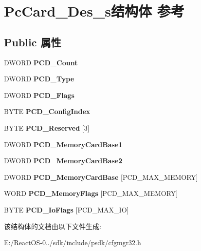 \hypertarget{struct_pc_card___des__s}{}\section{Pc\+Card\+\_\+\+Des\+\_\+s结构体 参考}
\label{struct_pc_card___des__s}
\subsection*{Public 属性}
\begin{DoxyCompactItemize}
\item 
\mbox{\label{struct_pc_card___des__s_ad6e3ef17a3f716eb30a77d6a23bf21c7}} 
D\+W\+O\+RD {\bfseries P\+C\+D\+\_\+\+Count}
\item 
\mbox{\label{struct_pc_card___des__s_ab2a809210da5d6c67a18ac30190928b5}} 
D\+W\+O\+RD {\bfseries P\+C\+D\+\_\+\+Type}
\item 
\mbox{\label{struct_pc_card___des__s_a30b77d8ec7f62c51acf4dbcc5dca4b2f}} 
D\+W\+O\+RD {\bfseries P\+C\+D\+\_\+\+Flags}
\item 
\mbox{\label{struct_pc_card___des__s_a4e29cedce929dd11760eafa000857254}} 
B\+Y\+TE {\bfseries P\+C\+D\+\_\+\+Config\+Index}
\item 
\mbox{\label{struct_pc_card___des__s_a00d0249d686c823f0031a7d9ef5d3211}} 
B\+Y\+TE {\bfseries P\+C\+D\+\_\+\+Reserved} \mbox{[}3\mbox{]}
\item 
\mbox{\label{struct_pc_card___des__s_a1dacdd12b67ba6e636871e85b2d32317}} 
D\+W\+O\+RD {\bfseries P\+C\+D\+\_\+\+Memory\+Card\+Base1}
\item 
\mbox{\label{struct_pc_card___des__s_af7f2221704ebf344edcf886c2dea7b6b}} 
D\+W\+O\+RD {\bfseries P\+C\+D\+\_\+\+Memory\+Card\+Base2}
\item 
\mbox{\label{struct_pc_card___des__s_a6feccce003a984ebef579ee611f12262}} 
D\+W\+O\+RD {\bfseries P\+C\+D\+\_\+\+Memory\+Card\+Base} \mbox{[}P\+C\+D\+\_\+\+M\+A\+X\+\_\+\+M\+E\+M\+O\+RY\mbox{]}
\item 
\mbox{\label{struct_pc_card___des__s_aeed8013da909e77d33cafa54cdcccfa0}} 
W\+O\+RD {\bfseries P\+C\+D\+\_\+\+Memory\+Flags} \mbox{[}P\+C\+D\+\_\+\+M\+A\+X\+\_\+\+M\+E\+M\+O\+RY\mbox{]}
\item 
\mbox{\label{struct_pc_card___des__s_ae3ae8bde7bceed415f2af9c59b4ea94c}} 
B\+Y\+TE {\bfseries P\+C\+D\+\_\+\+Io\+Flags} \mbox{[}P\+C\+D\+\_\+\+M\+A\+X\+\_\+\+IO\mbox{]}
\end{DoxyCompactItemize}


该结构体的文档由以下文件生成\+:\begin{DoxyCompactItemize}
\item 
E\+:/\+React\+O\+S-\/0../sdk/include/psdk/cfgmgr32.\+h\end{DoxyCompactItemize}
